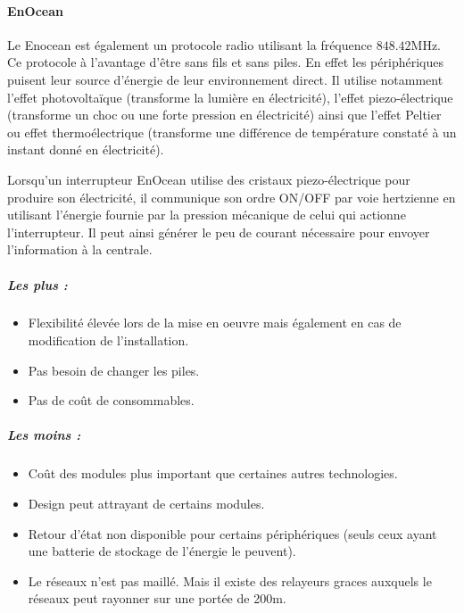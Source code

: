 \documentclass[a4paper,10pt]{article}
\begin{document}
\paragraph{EnOcean}
Le Enocean est également un protocole radio utilisant la fréquence $848.42$MHz. Ce protocole à l'avantage d'être sans fils et sans piles. En effet les périphériques puisent leur source d'énergie de leur environnement direct. Il utilise notamment l'effet photovoltaïque (transforme la lumière en électricité), l'effet piezo-électrique (transforme un choc ou une forte pression en électricité) ainsi que l’effet Peltier ou effet thermoélectrique (transforme une différence de température constaté à un instant donné en électricité).

Lorsqu’un interrupteur EnOcean utilise des cristaux piezo-électrique pour produire son électricité, il communique son ordre ON/OFF par voie hertzienne en utilisant l’énergie fournie par la pression mécanique de celui qui actionne l’interrupteur. Il peut ainsi générer le peu de courant nécessaire pour envoyer l’information à la centrale.

\subparagraph{Les plus :}
\begin{itemize}
\item Flexibilité élevée lors de la mise en oeuvre mais également en cas de modification de l'installation.
\item Pas besoin de changer les piles.
\item Pas de coût de consommables.
\end{itemize}
\subparagraph{Les moins :}
\begin{itemize}
\item Coût des modules plus important que certaines autres technologies.
\item Design peut attrayant de certains modules.
\item Retour d'état non disponible pour certains périphériques (seuls ceux ayant une batterie de stockage de l'énergie le peuvent).
\item Le réseaux n'est pas maillé. Mais il existe des relayeurs graces auxquels le réseaux peut rayonner sur une portée de 200m.\newline
\end{itemize}
\end{document}
